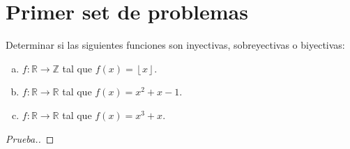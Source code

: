 \section{Primer set de problemas}

\begin{ejer}
	Determinar si las siguientes funciones son inyectivas, sobreyectivas o biyectivas:
	\begin{enumerate}[a.]
		\item $f: \mathbb{R} \to \mathbb{Z}$ tal que $f(x) = \left \lfloor {x} \right \rfloor$.
		\item $f: \mathbb{R} \to \mathbb{R}$ tal que $f(x) = x^2+x-1$.
		\item $f: \mathbb{R} \to \mathbb{R}$ tal que $f(x) = x^3+x$.
	\end{enumerate}

\end{ejer}

\begin{proof}[Prueba.]
	
\end{proof}
